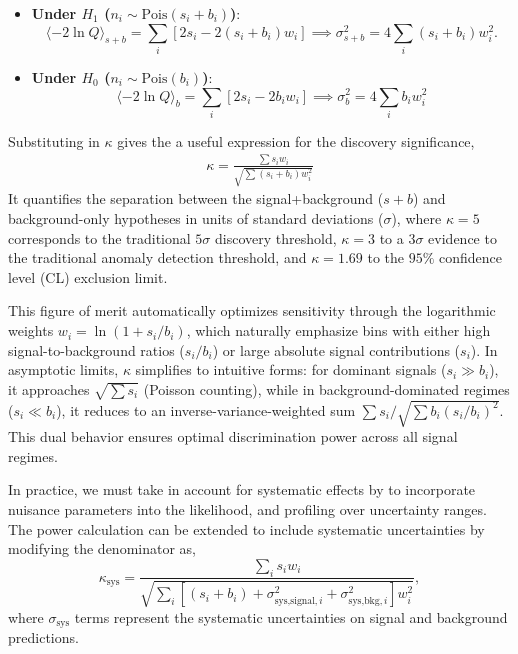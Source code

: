 \begin{itemize}
	\item \textbf{Under $H_1$ ($n_i \sim \text{Pois}(s_i + b_i)$)}:
	\begin{equation}
	\langle -2\ln Q \rangle_{s+b} = \sum_i \left[2s_i - 2(s_i + b_i)w_i\right]
	\implies \sigma^2_{s+b} = 4\sum_i (s_i + b_i) w_i^2.
	\end{equation}

	\item \textbf{Under $H_0$ ($n_i \sim \text{Pois}(b_i)$)}:
	\begin{equation}
	\langle -2\ln Q \rangle_{b} = \sum_i \left[2s_i - 2b_i w_i\right]
	\implies \sigma^2_{b} = 4\sum_i b_i w_i^2
	\end{equation}
\end{itemize}
Substituting in $\kappa$ gives the a useful expression for the discovery significance,
\begin{align}
\kappa = \frac{\sum s_i w_i}{\sqrt{\sum (s_i + b_i) w_i^2}}
\end{align}
It quantifies the separation between the signal+background ($s+b$) and background-only hypotheses in units of standard deviations ($\sigma$), where $\kappa = 5$ corresponds to the traditional $5\sigma$ discovery threshold, $\kappa =3$ to a $3\sigma$ evidence to the traditional anomaly detection threshold, and $\kappa = 1.69$ to the $95\%$ confidence level (CL) exclusion limit.


This figure of merit automatically optimizes sensitivity through the logarithmic weights $w_i = \ln(1 + s_i/b_i)$, which naturally emphasize bins with either high signal-to-background ratios ($s_i/b_i$) or large absolute signal contributions ($s_i$). In asymptotic limits, $\kappa$ simplifies to intuitive forms: for dominant signals ($s_i \gg b_i$), it approaches $\sqrt{\sum s_i}$ (Poisson counting), while in background-dominated regimes ($s_i \ll b_i$), it reduces to an inverse-variance-weighted sum $\sum s_i / \sqrt{\sum b_i (s_i/b_i)^2}$. This dual behavior ensures optimal discrimination power across all signal regimes.

In practice, we must take in account for systematic effects by to incorporate nuisance parameters into the likelihood, and profiling over uncertainty ranges. The power calculation can be extended to include systematic uncertainties by modifying the denominator as,
\begin{equation}
	\boxed{
	\kappa_{\text{sys}} = \frac{\sum_i s_i w_i}{\sqrt{\sum_i \left[(s_i + b_i) + \sigma^2_{\text{sys,signal},i} + \sigma^2_{\text{sys,bkg},i}\right] w_i^2}},
}
\label{eq:kappa_with_systematics}
\end{equation}
where $\sigma_{\text{sys}}$ terms represent the systematic uncertainties on signal and background predictions.
